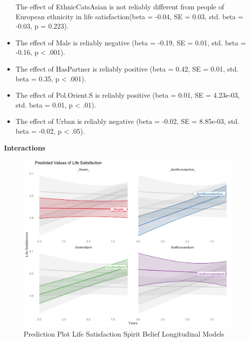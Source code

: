 \documentclass[
  english,
  man]{apa6}
\begin{document}
\begin{itemize}
  The effect of EthnicCatsAsian is not reliably different from people of European ethnicity in life satisfaction(beta = -0.04, SE = 0.03, std. beta = -0.03, p = 0.223).
\item
  The effect of Male is reliably negative (beta = -0.19, SE = 0.01, std. beta = -0.16, p \textless{} .001).
\item
  The effect of HasPartner is reliably positive (beta = 0.42, SE = 0.01, std. beta = 0.35, p \textless{} .001).
\item
  The effect of Pol.Orient.S is reliably positive (beta = 0.01, SE = 4.23e-03, std. beta = 0.01, p \textless{} .01).
\item
  The effect of Urban is reliably negative (beta = -0.02, SE = 8.85e-03, std. beta = -0.02, p \textless{} .05).
\end{itemize}

\textbf{Interactions}

\begin{figure}

{\centering \includegraphics[width=6.4in]{Figs/USElifsat_expected-1} 

}

\caption{Prediction Plot Life Satisfaction Spirit Belief Longitudinal Models}\label{fig:unnamed-chunk-8}
\end{figure}
\end{document}

